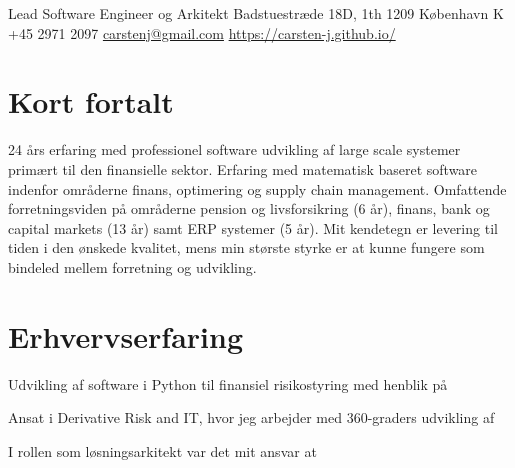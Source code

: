 \documentclass[10pt, a4paper]{article}
\begin{document}
{Lead Software Engineer og Arkitekt}
{Badstuestræde 18D, 1th}
{1209 København K}
{+45 2971 2097}
{\href{mailto:carstenj@gmail.com}{carstenj@gmail.com}}
{\href{https://carsten-j.github.io/}{https://carsten-j.github.io/}}
\section{Kort fortalt}
24 års erfaring med professionel software udvikling af large scale systemer primært til den finansielle sektor. Erfaring med matematisk baseret software indenfor områderne finans, optimering og supply chain management. Omfattende forretningsviden på områderne pension og livsforsikring (6 år), finans, bank og capital markets (13 år) samt ERP systemer (5 år). Mit kendetegn er levering til tiden i den ønskede kvalitet, mens min største styrke er at kunne fungere som bindeled mellem forretning og udvikling.

\section{Erhvervserfaring}

{Udvikling af software i Python til finansiel risikostyring med henblik på
}
{
}

{Ansat i Derivative Risk and IT, hvor jeg arbejder med 360-graders udvikling af}
{
}

{I rollen som løsningsarkitekt var det mit ansvar at}
{
}
\end{document}
